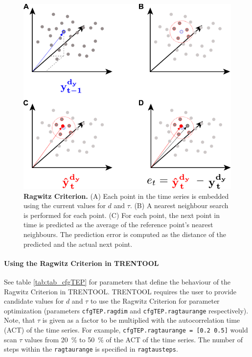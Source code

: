 \documentclass[a4paper,10pt]{article}
\begin{document}
\begin{figure}[H]	
	\centering 
 		\includegraphics{ragwitz_02.pdf}
	\caption[Ragwitz Criterion]{\textbf{Ragwitz Criterion.} (A) Each point in the time series is embedded using the current values for $d$ and $\tau$. (B) A nearest neighbour search is performed for each point. (C) For each point, the next point in time is predicted as the average of the reference point's nearest neighbours. The prediction error is computed as the distance of the predicted and the actual next point.}
	\label{fig:ragwitz}
\end{figure} 


\paragraph*{Using the Ragwitz Criterion in TRENTOOL} See table \ref{tab:tab_cfgTEP} for parameters that define the behaviour of the Ragwitz Criterion in TRENTOOL. TRENTOOL requires the user to provide candidate values for $d$ and $\tau$ to use the Ragwitz Criterion for parameter optimization (parameters  \texttt{cfgTEP.ragdim} and \texttt{cfgTEP.ragtaurange} respectively). Note, that $\tau$ is given as a factor to be multiplied with the autocorrelation time (ACT) of the time series. For example, \texttt{cfgTEP.ragtaurange = [0.2 0.5]} would scan $\tau$ values from 20~\% to 50~\% of the ACT of the time series. The number of steps within the \texttt{ragtaurange} is specified in \texttt{ragtausteps}. 
\end{document}
